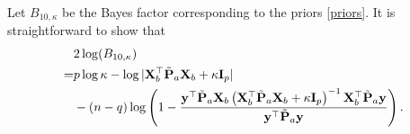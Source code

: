 \documentclass[smallextended]{svjour3}       %
\DeclareMathOperator{\myRank}{Rank}
\newcommand{\By}{\mathbf{y}}    \newcommand{\Bz}{\mathbf{z}}
\newcommand{\bfsym}[1]{\ensuremath{\boldsymbol{#1}}}
\def\bbeta{\bfsym \beta}
\begin{document}

Let $B_{10,\kappa} $ be the Bayes factor corresponding to the priors \eqref{priors}.
 It is straightforward to show that
 \begin{equation}\label{new:tuoyan1}
    \begin{split}
        &2\log (B_{10,{\kappa}})
        \\
        =  &
    p\log \kappa
    -
        \log |\BX_b^\top \tilde \BP_a \BX_b + \kappa \BI_p |
    \\
    &
    -(n-q)\log \left(
            1-
        \frac{
            \By^\top \tilde \BP_a \BX_b
            \left(\BX_b^\top  \tilde \BP_a \BX_b + \kappa \BI_p\right)^{-1}
            \BX_b^\top \tilde \BP_a \By
        }{
            \By^\top \tilde \BP_a \By
        }
    \right).
    \end{split}
\end{equation}
\end{document}
